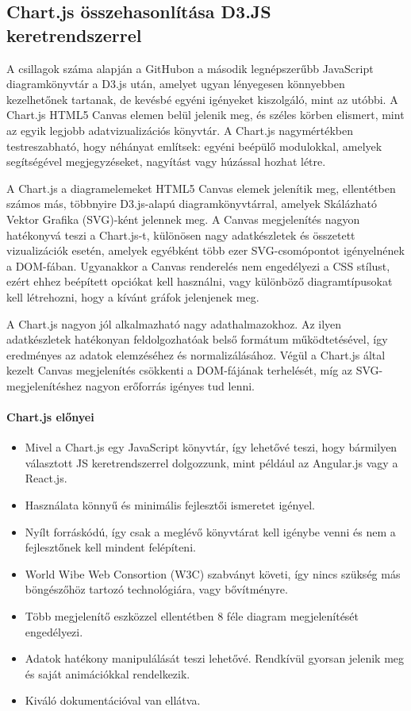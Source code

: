 \pagebreak

\subsection{Chart.js összehasonlítása D3.JS keretrendszerrel}

A csillagok száma alapján a GitHubon a második legnépszerűbb JavaScript diagramkönyvtár a D3.js után, amelyet ugyan lényegesen könnyebben kezelhetőnek tartanak, de kevésbé egyéni igényeket kiszolgáló, mint az utóbbi. A Chart.js HTML5 Canvas elemen belül jelenik meg, és széles körben elismert, mint az egyik legjobb adatvizualizációs könyvtár.
A Chart.js nagymértékben testreszabható, hogy néhányat említsek: egyéni beépülő modulokkal, amelyek segítségével megjegyzéseket, nagyítást vagy húzással hozhat létre.

	A Chart.js a diagramelemeket HTML5 Canvas elemek jelenítik meg, ellentétben számos más, többnyire D3.js-alapú diagramkönyvtárral, amelyek Skálázható Vektor Grafika (SVG)-ként jelennek meg. A Canvas megjelenítés nagyon hatékonyvá teszi a Chart.js-t, különösen nagy adatkészletek és összetett vizualizációk esetén, amelyek egyébként több ezer SVG-csomópontot igényelnének a DOM-fában. Ugyanakkor a Canvas renderelés nem engedélyezi a CSS stílust, ezért ehhez beépített opciókat kell használni, vagy különböző diagramtípusokat kell létrehozni, hogy a kívánt gráfok jelenjenek meg. 

	A Chart.js nagyon jól alkalmazható nagy adathalmazokhoz. Az ilyen adatkészletek hatékonyan feldolgozhatóak belső formátum működtetésével, így eredményes az adatok elemzéséhez és normalizálásához. Végül a Chart.js által kezelt Canvas megjelenítés csökkenti a DOM-fájának terhelését, míg az SVG-megjelenítéshez nagyon erőforrás igényes tud lenni. \cite{wikiChart}

\pagebreak

\paragraph{Chart.js előnyei}

\begin{itemize}
\item Mivel a Chart.js egy JavaScript könyvtár, így lehetővé teszi, hogy bármilyen választott JS keretrendszerrel dolgozzunk, mint például az Angular.js vagy a React.js.
\item Használata könnyű és minimális fejlesztői ismeretet igényel.
\item Nyílt forráskódú, így csak a meglévő könyvtárat kell igénybe venni és nem a fejlesztőnek kell mindent felépíteni.
\item World Wibe Web Consortion (W3C) szabványt követi, így nincs szükség más böngészőhöz tartozó technológiára, vagy bővítményre.
\item Több megjelenítő eszközzel ellentétben 8 féle diagram megjelenítését engedélyezi.
\item Adatok hatékony manipulálását teszi lehetővé. Rendkívül gyorsan jelenik meg és saját animációkkal rendelkezik.
\item Kiváló dokumentációval van ellátva.
\end{itemize}
